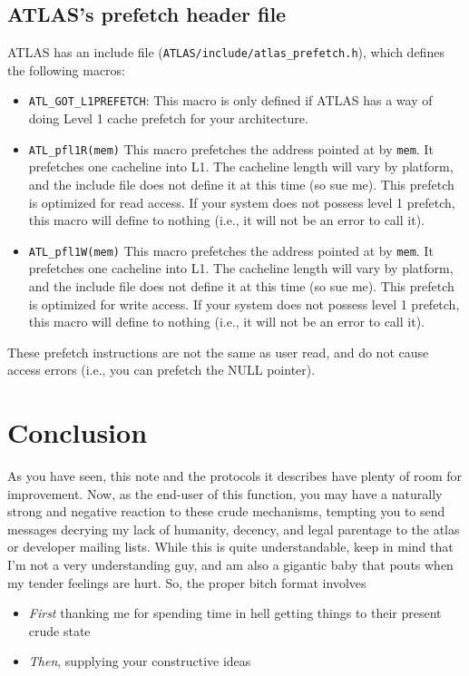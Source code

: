 \documentclass[11pt]{article}
\begin{document}
\subsection{ATLAS's prefetch header file \label{sec-prefetch}}
ATLAS has an include file ({\tt ATLAS/include/atlas\_prefetch.h}),
which defines the following macros:
\begin{itemize}
\item {\tt ATL\_GOT\_L1PREFETCH}: This macro is only defined if ATLAS has
a way of doing Level 1 cache prefetch for your architecture.
\item {\tt ATL\_pfl1R(mem)} This macro prefetches the address pointed at
by {\tt mem}.  It prefetches one cacheline into L1.  The cacheline length
will vary by platform, and the include file does not define it at this
time (so sue me).  This prefetch is optimized for read access.  If your
system does not possess level 1 prefetch, this macro will define to nothing
(i.e., it will not be an error to call it).
\item {\tt ATL\_pfl1W(mem)} This macro prefetches the address pointed at
by {\tt mem}.  It prefetches one cacheline into L1.  The cacheline length
will vary by platform, and the include file does not define it at this
time (so sue me).  This prefetch is optimized for write access.  If your
system does not possess level 1 prefetch, this macro will define to nothing
(i.e., it will not be an error to call it).
\end{itemize}

These prefetch instructions are not the same as user read, and do not
cause access errors (i.e., you can prefetch the NULL pointer).

\section{Conclusion}
As you have seen, this note and the protocols it describes have plenty of
room for improvement.  Now, as the end-user of this function, you may have
a naturally strong and negative reaction to these crude mechanisms, tempting
you to send messages decrying my lack of humanity, decency, and legal
parentage to the atlas or developer mailing lists.  While this is quite
understandable, keep in mind that I'm not a very understanding guy, and
am also a gigantic baby that pouts when my tender feelings are hurt.  So,
the proper bitch format involves 
\begin{itemize}
\item {\em First} thanking me for spending time in hell getting things
to their present crude state
\item {\em Then}, supplying your constructive ideas
\end{itemize}
\end{document}

